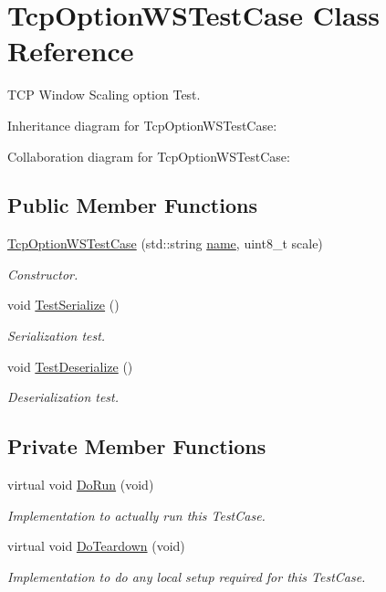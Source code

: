 \hypertarget{classTcpOptionWSTestCase}{}\section{Tcp\+Option\+W\+S\+Test\+Case Class Reference}
\label{classTcpOptionWSTestCase}


T\+CP Window Scaling option Test.  




Inheritance diagram for Tcp\+Option\+W\+S\+Test\+Case\+:


Collaboration diagram for Tcp\+Option\+W\+S\+Test\+Case\+:
\subsection*{Public Member Functions}
\begin{DoxyCompactItemize}
\item 
\hyperlink{classTcpOptionWSTestCase_acab7e6a021cd4c0223cb23f813eb8299}{Tcp\+Option\+W\+S\+Test\+Case} (std\+::string \hyperlink{generate__test__data__lte__spectrum__model_8m_ab74e6bf80237ddc4109968cedc58c151}{name}, uint8\+\_\+t scale)
\begin{DoxyCompactList}\small\item\em Constructor. \end{DoxyCompactList}\item 
void \hyperlink{classTcpOptionWSTestCase_a01e4f68295082d8a146f561a6c727d45}{Test\+Serialize} ()
\begin{DoxyCompactList}\small\item\em Serialization test. \end{DoxyCompactList}\item 
void \hyperlink{classTcpOptionWSTestCase_a345cb1defb9412d11084af2c99bd32e9}{Test\+Deserialize} ()
\begin{DoxyCompactList}\small\item\em Deserialization test. \end{DoxyCompactList}\end{DoxyCompactItemize}
\subsection*{Private Member Functions}
\begin{DoxyCompactItemize}
\item 
virtual void \hyperlink{classTcpOptionWSTestCase_ade54e1b2acc4fe1ba2cb80dee7a35b78}{Do\+Run} (void)
\begin{DoxyCompactList}\small\item\em Implementation to actually run this Test\+Case. \end{DoxyCompactList}\item 
virtual void \hyperlink{classTcpOptionWSTestCase_ad0443f11e97deca8bd35e402ca6cfb25}{Do\+Teardown} (void)
\begin{DoxyCompactList}\small\item\em Implementation to do any local setup required for this Test\+Case. \end{DoxyCompactList}\end{DoxyCompactItemize}
